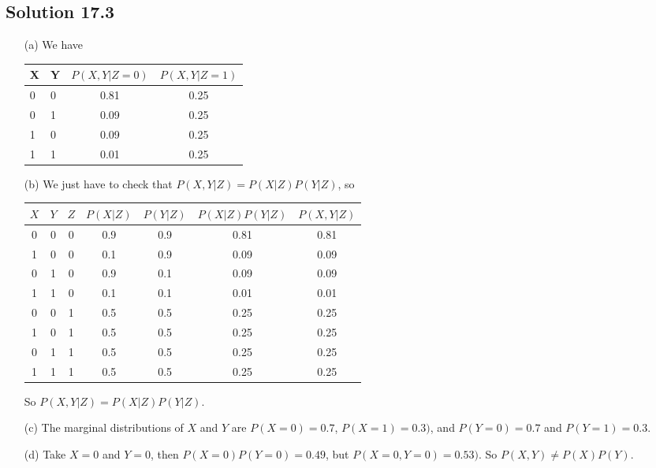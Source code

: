 \subsection*{Solution 17.3}

\begin{itemize}
    \item[(a)]
        We have
        \begin{table}[H]
            \begin{tabular}{l|l||c|c}
                X & Y & $P(X,Y|Z=0)$ & $P(X,Y|Z=1)$ \\ \hline \hline
                0 & 0 & 0.81         & 0.25         \\ \hline
                0 & 1 & 0.09         & 0.25         \\ \hline
                1 & 0 & 0.09         & 0.25         \\ \hline
                1 & 1 & 0.01         & 0.25
            \end{tabular}
        \end{table}
    \item[(b)] We just have to check that $P(X,Y|Z) = P(X|Z)P(Y|Z)$, so
        \begin{table}[H]
            \begin{tabular}{c|c|c||c|c|c|c}
                $X$ & $Y$ & $Z$ & $P(X|Z)$ & $P(Y|Z)$ & $P(X|Z)P(Y|Z)$ & $P(X,Y|Z)$ \\ \hline \hline
                0   & 0   & 0   & 0.9      & 0.9      & 0.81           & 0.81       \\ \hline
                1   & 0   & 0   & 0.1      & 0.9      & 0.09           & 0.09       \\ \hline
                0   & 1   & 0   & 0.9      & 0.1      & 0.09           & 0.09       \\ \hline
                1   & 1   & 0   & 0.1      & 0.1      & 0.01           & 0.01       \\ \hline
                0   & 0   & 1   & 0.5      & 0.5      & 0.25           & 0.25       \\ \hline
                1   & 0   & 1   & 0.5      & 0.5      & 0.25           & 0.25       \\ \hline
                0   & 1   & 1   & 0.5      & 0.5      & 0.25           & 0.25       \\ \hline
                1   & 1   & 1   & 0.5      & 0.5      & 0.25           & 0.25
            \end{tabular}
        \end{table}
        So $P(X,Y|Z) = P(X|Z)P(Y|Z)$.
    \item[(c)] The marginal distributions of $X$ and $Y$ are $P(X = 0) = 0.7$, $P(X = 1) = 0.3)$, and $P(Y = 0) = 0.7$ and $P(Y = 1) = 0.3$.
    \item[(d)] Take $X = 0$ and $Y = 0$, then $P(X=0)P(Y=0) = 0.49$, but $P(X=0,Y=0) = 0.53)$.
        So $P(X, Y) \neq P(X)P(Y)$.
\end{itemize}


